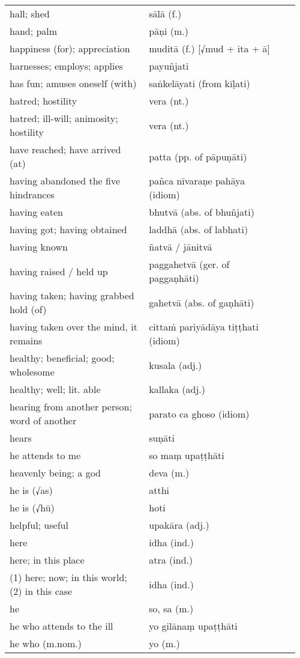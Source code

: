 \documentclass[a5paper]{memoir}
\begin{document}
\begin{longtable}{L{0.48\linewidth} L{0.48\linewidth} H}
hall; shed & sālā (f.) & \\
hand; palm & pāṇi (m.) & \\
happiness (for); appreciation & muditā (f.) [√mud + ita + ā] & \\
harnesses; employs; applies & payuñjati & \\
has fun; amuses oneself (with) & saṅkelāyati (from kīḷati) & \\
hatred; hostility & vera (nt.) & \\
hatred; ill-will; animosity; hostility & vera (nt.) & \\
have reached; have arrived (at) & patta (pp. of pāpuṇāti) & \\
having abandoned the five hindrances & pañca nīvaraṇe pahāya (idiom) & \\
having eaten & bhutvā (abs. of bhuñjati) & \\
having got; having obtained & laddhā (abs. of labhati) & \\
having known & ñatvā / jānitvā & \\
having raised / held up & paggahetvā (ger. of paggaṇhāti) & \\
having taken; having grabbed hold (of) & gahetvā (abs. of gaṇhāti) & \\
having taken over the mind, it remains & cittaṁ pariyādāya tiṭṭhati (idiom) & \\
healthy; beneficial; good; wholesome & kusala (adj.) & \\
healthy; well; lit. able & kallaka (adj.) & \\
hearing from another person; word of another & parato ca ghoso (idiom) & \\
hears & suṇāti & \\
he attends to me & so maṃ upaṭṭhāti & \\
heavenly being; a god & deva (m.) & \\
he is (√as) & atthi & \\
he is (√hū) & hoti & \\
helpful; useful & upakāra (adj.) & \\
here & idha (ind.) & \\
here; in this place & atra (ind.) & \\
(1) here; now; in this world; (2) in this case & idha (ind.) & \\
he & so, sa (m.) & \\
he who attends to the ill & yo gilānaṃ upaṭṭhāti & \\
he who (m.nom.) & yo (m.) & \\

\end{longtable}
\end{document}
